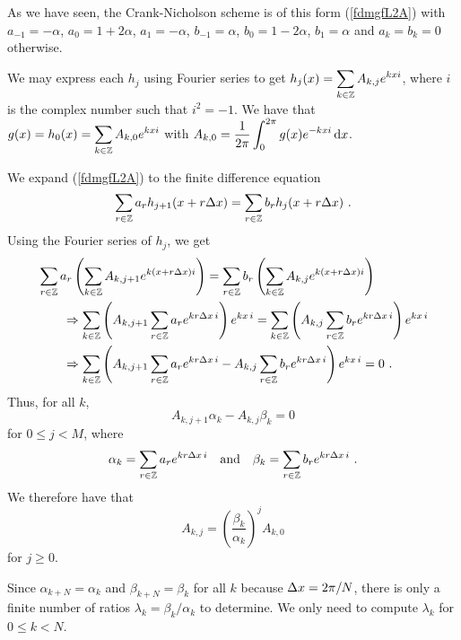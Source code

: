 \begin{egg}
As we have seen, the Crank-Nicholson scheme is of this form
(\ref{fdmgfL2A}) with $a_{-1}=-\alpha$, $a_0 = 1+2\alpha$, $a_1=-\alpha$, 
$b_{-1} =\alpha$, $b_0 = 1-2\alpha$, $b_1 = \alpha$ and
$a_k = b_k = 0$ otherwise.
\end{egg}

We may express each $h_j$ using Fourier series to get
$\displaystyle h_j(x) = \sum_{k\in \mathbb{Z}} A_{k,j} e^{kxi}$, where $i$
is the complex number such that $i^2=-1$.  We have that
$\displaystyle g(x) = h_0(x) = \sum_{k\in \mathbb{Z}} A_{k,0} e^{kxi}$
with $\displaystyle A_{k,0} = \frac{1}{2\pi} \int_0^{2\pi} g(x) e^{-kxi}\,\mathrm{d}x$.

We expand (\ref{fdmgfL2A}) to the finite difference equation
\begin{equation}\label{fdmgfL2B}
\sum_{r\in \mathbb{Z}} a_r h_{j+1}(x+r\Delta{x}) =
\sum_{r\in \mathbb{Z}} b_r h_j(x+r\Delta{x}) \ .
\end{equation}
Using the Fourier series of $h_j$, we get
\begin{align*}
&\sum_{r\in \mathbb{Z}} a_r \left( \sum_{k\in \mathbb{Z}} A_{k,j+1} e^{k(x+r\Delta{x})i}\right)
 = \sum_{r\in \mathbb{Z}} b_r \left( \sum_{k\in \mathbb{Z}} A_{k,j} e^{k(x+r\Delta{x})i}\right)  \\
& \qquad \Rightarrow
\sum_{k\in \mathbb{Z}}\left( A_{k,j+1} \sum_{r\in \mathbb{Z}} a_r e^{kr \Delta{x}\, i} \right)
e^{k x\,i}
= \sum_{k\in \mathbb{Z}}\left( A_{k,j} \sum_{r\in\mathbb{Z}} b_r  e^{k r \Delta{x}\, i} \right)
e^{k x\,i} \\
& \qquad \Rightarrow
\sum_{k\in \mathbb{Z}}\left( A_{k,j+1} \sum_{r\in \mathbb{Z}} a_r e^{k r \Delta{x}\, i}
- A_{k,j} \sum_{r\in \mathbb{Z}} b_r e^{k r \Delta{x}\, i} \right) e^{k x\,i} = 0 \ .
\end{align*}
Thus, for all $k$,
\begin{equation}\label{fdmgfL2C}
  A_{k,j+1} \alpha_k -  A_{k,j}  \beta_k = 0
\end{equation}
for $0\leq j < M$, where
\[
\alpha_k = \sum_{r\in \mathbb{Z}} a_r e^{k r \Delta{x}\, i} \quad \text{and} \quad
\beta_k = \sum_{r\in \mathbb{Z}} b_r  e^{k r \Delta{x}\, i}  \ .
\]
We therefore have that
\[
  A_{k,j} = \left(\frac{\beta_k}{\alpha_k}\right)^j A_{k,0}
\]
for $j \geq 0$.

Since $\alpha_{k+N} = \alpha_k$ and $\beta_{k+N} = \beta_k$ for all
$k$ because $\Delta{x} = 2\pi/N$, there is only a finite number of
ratios $\displaystyle \lambda_k = \beta_k/\alpha_k$ to
determine.  We only need to compute $\lambda_k$ for $0 \leq k < N$.

